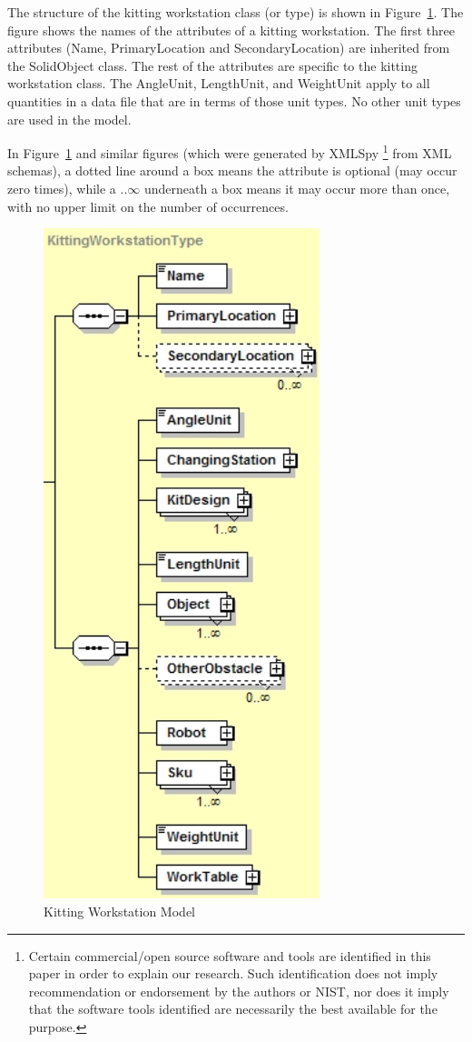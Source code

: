 The structure of the kitting workstation class (or type) is shown in
Figure~\ref{fig:WorkstationModel}. The figure shows the names of the
attributes of a kitting workstation. The first three attributes (Name,
PrimaryLocation and SecondaryLocation) are inherited from the SolidObject
class. The rest of the attributes are specific to the kitting workstation
class. The AngleUnit, LengthUnit, and WeightUnit apply to all quantities in
a data file that are in terms of those unit types. No other unit types are
used in the model.

In Figure~\ref{fig:WorkstationModel} and similar figures (which were
generated by XMLSpy
\footnote{Certain commercial/open source software and tools are identified in this paper in order to explain our research. Such identification does not imply
recommendation or endorsement by the authors or NIST, nor does it imply that the software tools identified are necessarily the best available for the purpose.}
 from XML schemas), a dotted line around a box
means the attribute is optional (may occur zero times), while a 
$..\infty$  underneath a box means it may occur more than once, with no
upper limit on the number of occurrences.

\begin{figure}[t!]
\centering
\includegraphics[width=3.166in]{images/kittingModelSmallCropped.jpg}
\caption{Kitting Workstation Model}
\label{fig:WorkstationModel}
\end{figure}

